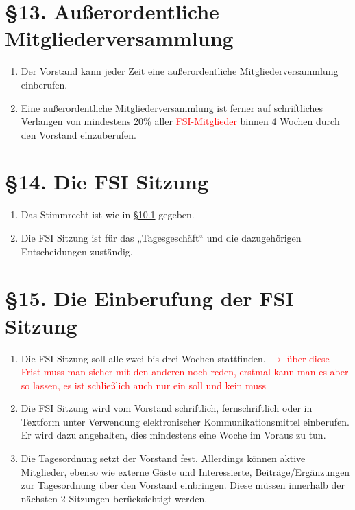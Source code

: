 \documentclass[a4paper,12pt]{article}
\newcommand{\red}[1]{\textcolor{red}{#1}}
\begin{document}
\section*{§13. Außerordentliche Mitgliederversammlung}

\begin{enumerate}
	\item
		Der Vorstand kann jeder Zeit eine außerordentliche
		Mitgliederversammlung einberufen.
    	\item
		Eine außerordentliche Mitgliederversammlung ist ferner auf
		schriftliches Verlangen von mindestens 20\% aller
		\red{FSI-Mitglieder} binnen 4 Wochen durch den Vorstand
		einzuberufen.
\end{enumerate}

\section*{§14. Die FSI Sitzung}

\begin{enumerate}
    	\item
		Das Stimmrecht ist wie in \hyperref[10.1_Stimmrecht]{§10.1} gegeben.
    	\item
		Die FSI Sitzung ist für das „Tagesgeschäft“ und die
		dazugehörigen Entscheidungen zuständig.
\end{enumerate}

\section*{§15. Die Einberufung der FSI Sitzung}

\begin{enumerate}
    	\item
		Die FSI Sitzung soll alle zwei bis drei Wochen stattfinden. \red{$\rightarrow$ über diese Frist muss man sicher mit den anderen noch reden, erstmal kann man es aber so lassen, es ist schließlich auch nur ein \glqq soll\grqq{} und kein \glqq muss\grqq{}}
    	\item
		Die FSI Sitzung wird vom Vorstand schriftlich, fernschriftlich
		oder in Textform unter Verwendung elektronischer
		Kommunikationsmittel einberufen. Er wird dazu angehalten, dies
		mindestens eine Woche im Voraus zu tun.
    	\item
		Die Tagesordnung setzt der Vorstand fest. Allerdings können
		aktive Mitglieder, ebenso wie externe Gäste und Interessierte,
		Beiträge/Ergänzungen zur Tagesordnung über den Vorstand
		einbringen. Diese müssen innerhalb der nächsten 2 Sitzungen
		berücksichtigt werden.
\end{enumerate}
\end{document}
